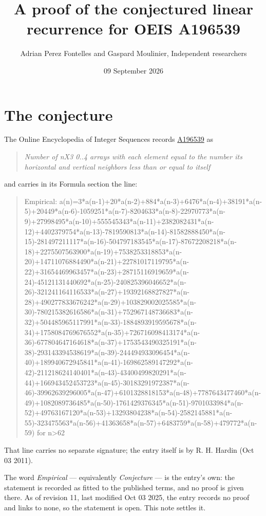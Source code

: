 \documentclass[11pt]{article}
\title{A proof of the conjectured linear recurrence for OEIS A196539}
\author{Adrian Perez Fontelles and Gaspard Moulinier, Independent researchers}
\date{09 September 2026}
\theoremstyle{definition}
\begin{document}
\maketitle
\section{The conjecture}

The Online Encyclopedia of Integer Sequences records \href{https://oeis.org/A196539}{A196539} as

\begin{quote}\itshape Number of nX3 0..4 arrays with each element equal to the number its horizontal and vertical neighbors less than or equal to itself\end{quote}

and carries in its Formula section the line:

\begin{quote}\ttfamily Empirical: a(n)=3*a(n-1)+20*a(n-2)+884*a(n-3)+6476*a(n-4)+38191*a(n-5)+20449*a(n-6)-1059251*a(n-7)-8204633*a(n-8)-22970773*a(n-9)+27998495*a(n-10)+555545343*a(n-11)+2382082431*a(n-12)+4402379754*a(n-13)-7819590813*a(n-14)-81582888450*a(n-15)-281497211117*a(n-16)-504797183545*a(n-17)-87672208218*a(n-18)+2275507563900*a(n-19)+7538253318853*a(n-20)+14711076884490*a(n-21)+22781017119795*a(n-22)+31654469963457*a(n-23)+28715116919659*a(n-24)-45121131440692*a(n-25)-240825396046652*a(n-26)-321241164116533*a(n-27)+19392168827827*a(n-28)+490277833676242*a(n-29)+103829002025585*a(n-30)-780215382616586*a(n-31)+752967148736683*a(n-32)+504485965117991*a(n-33)-1884893919595678*a(n-34)+1758084769676552*a(n-35)+726716098413174*a(n-36)-677804647164618*a(n-37)+1753543490325191*a(n-38)-293143394538619*a(n-39)-244494933096454*a(n-40)+189940672945841*a(n-41)-169862589147292*a(n-42)-211218624140401*a(n-43)-43400499820291*a(n-44)+166943452453723*a(n-45)-30183291972387*a(n-46)-39962639296005*a(n-47)+6101328818153*a(n-48)+7787643477460*a(n-49)+1082089736485*a(n-50)-1761429376345*a(n-51)-9701033984*a(n-52)+49763167120*a(n-53)+13293804238*a(n-54)-2582145881*a(n-55)-323475563*a(n-56)+41363658*a(n-57)+6483759*a(n-58)+479772*a(n-59) for n>62\end{quote}

That line carries no separate signature; the entry itself is by R. H. Hardin (Oct 03 2011).

The word {\itshape Empirical} --- equivalently {\itshape Conjecture} --- is the entry's own: the statement is recorded as fitted to the published terms, and no proof is given there. As of revision 11, last modified Oct 03 2025, the entry records no proof and links to none, so the statement is open. This note settles it.
\end{document}
